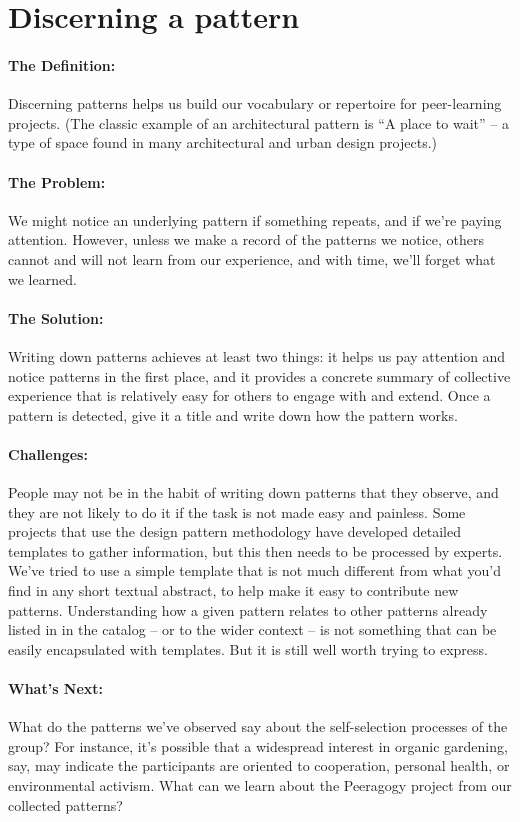\section{Discerning a pattern}
\paragraph{The Definition:} Discerning patterns helps us build our
vocabulary or repertoire for peer-learning projects. (The classic
example of an architectural pattern is ``A place to wait'' -- a type of
space found in many architectural and urban design projects.)

\paragraph{The Problem:} We might notice an underlying pattern if something
repeats, and if we're paying attention. However, unless we make a record
of the patterns we notice, others cannot and will not learn from our
experience, and with time, we'll forget what we learned.

\paragraph{The Solution:} Writing down patterns achieves at least two
things: it helps us pay attention and notice patterns in the first
place, and it provides a concrete summary of collective experience that
is relatively easy for others to engage with and extend. Once a pattern
is detected, give it a title and write down how the pattern works.

\paragraph{Challenges:} People may not be in the habit of writing down
patterns that they observe, and they are not likely to do it if the task
is not made easy and painless. Some projects that use the design pattern
methodology have developed detailed templates to gather information, but
this then needs to be processed by experts. We've tried to use a simple
template that is not much different from what you'd find in any short
textual abstract, to help make it easy to contribute new patterns.
Understanding how a given pattern relates to other patterns already
listed in in the catalog -- or to the wider context -- is not something
that can be easily encapsulated with templates. But it is still well
worth trying to express.

\paragraph{What's Next:} What do the patterns we've observed say about the
self-selection processes of the group? For instance, it's possible that
a widespread interest in organic gardening, say, may indicate the
participants are oriented to cooperation, personal health, or
environmental activism. What can we learn about the Peeragogy project
from our collected patterns?

